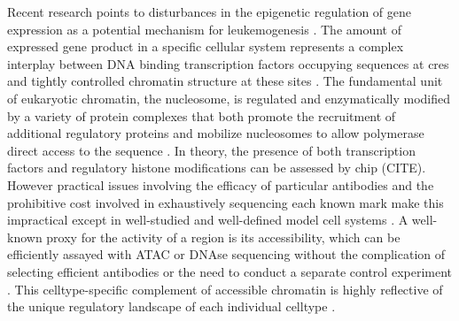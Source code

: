 
Recent research points to disturbances in the epigenetic regulation of gene expression as a potential mechanism for leukemogenesis \cite{Krivtsov2007}. The amount of expressed gene product in a specific cellular system represents a complex interplay between DNA binding transcription factors occupying sequences at \glspl{cre} and tightly controlled chromatin structure at these sites \cite{Cierpicki2010}. The fundamental unit of eukaryotic chromatin, the nucleosome, is regulated and enzymatically modified by a variety of protein complexes that both promote the recruitment of additional regulatory proteins and mobilize nucleosomes to allow polymerase direct access to the sequence \cite{Klemm2019a,Hu2016}. In theory, the presence of both transcription factors and regulatory histone modifications can be assessed by \gls{chip} (CITE). However practical issues involving the efficacy of particular antibodies and the prohibitive cost involved in exhaustively sequencing each known mark make this impractical except in well-studied and well-defined model cell systems \cite{Park2009}. A well-known proxy for the activity of a region is its accessibility, which can be efficiently assayed with ATAC or DNAse sequencing without the complication of selecting efficient antibodies or the need to conduct a separate control experiment \cite{Song2011,Minnoye2021,Thurman2012,Boyle2008}. This celltype-specific complement of accessible chromatin is highly reflective of the unique regulatory landscape of each individual celltype \cite{Thurman2012,Zhang2021,Schulz2019}. 

